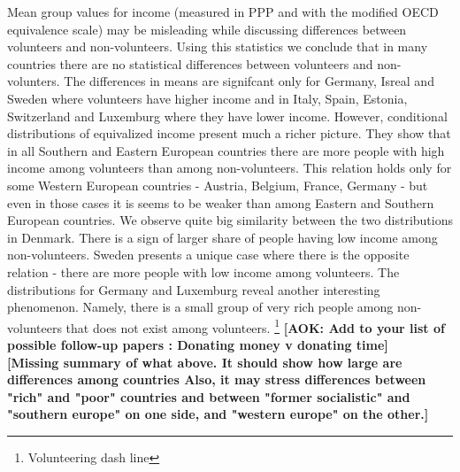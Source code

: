 \documentclass[10pt, letterpaper]{article}
\begin{document}
\begin{spacing}{1.4}
Mean group values for income (measured in PPP and with the modified OECD equivalence scale) may be misleading while discussing differences between volunteers and non-volunteers. Using this statistics we conclude that in many countries there are no statistical differences between volunteers and non-volunters. The differences in means are signifcant only for Germany, Isreal and Sweden where volunteers have higher income and in Italy, Spain, Estonia, Switzerland and Luxemburg where they have lower income. However, conditional distributions of equivalized income present much a richer picture. They show that in  all Southern and Eastern European countries there are more people with high income among volunteers than among non-volunteers. This relation holds only for some Western European countries - Austria, Belgium, France, Germany - but even in those cases it is seems to be weaker than among Eastern and Southern European countries. We observe   quite big similarity between the two distributions in Denmark. There is a sign of larger share of people having low income among non-volunteers. Sweden presents a unique case where there is the opposite relation - there are more people with low income among volunteers. The distributions for Germany and Luxemburg reveal another interesting phenomenon. Namely, there is a small group of very rich people among non-volunteers that does not exist among volunteers. \footnote{Volunteering dash line} \textbf{[AOK: Add to your list of possible follow-up papers : Donating money v donating time] } \\

\textbf{[Missing summary of what above. It should show how large are differences among countries Also, it may stress differences between "rich" and "poor" countries and between "former socialistic" and "southern europe" on one side, and "western europe" on the other.]}

 





\end{spacing}
\end{document}
